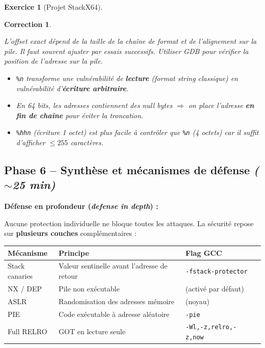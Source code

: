 \documentclass[a4paper,11pt]{article}
\theoremstyle{plain}
\newtheorem{correction}{Correction}
\theoremstyle{definition}
\newtheorem{exercice}{Exercice}
\begin{document}
\begin{exercice}[Projet StackX64]
\begin{correction}
\begin{attention}
L'offset exact dépend de la taille de la chaîne de format et de l'alignement sur la pile. Il faut souvent ajuster par essais successifs. Utiliser GDB pour vérifier la position de l'adresse sur la pile.
\end{attention}

\begin{pointcle}
\begin{itemize}
    \item \texttt{\%n} transforme une vulnérabilité de \textbf{lecture} (format string classique) en vulnérabilité d'\textbf{écriture arbitraire}.
    \item En 64 bits, les adresses contiennent des null bytes $\Rightarrow$ on place l'adresse \textbf{en fin de chaîne} pour éviter la troncation.
    \item \texttt{\%hhn} (écriture 1 octet) est plus facile à contrôler que \texttt{\%n} (4 octets) car il suffit d'afficher $\leq 255$ caractères.
\end{itemize}
\end{pointcle}

\end{correction}



\subsection*{Phase 6 -- Synthèse et mécanismes de défense \hfill\normalfont\textit{($\sim$25 min)}}

\begin{rappel}
\textbf{Défense en profondeur (\textit{defense in depth}) :}

Aucune protection individuelle ne bloque toutes les attaques. La sécurité repose sur \textbf{plusieurs couches} complémentaires :

\begin{center}
\begin{tabular}{llll}
\toprule
\textbf{Mécanisme} & \textbf{Principe} & \textbf{Flag GCC} \\
\midrule
Stack canaries & Valeur sentinelle avant l'adresse de retour & \texttt{-fstack-protector} \\
NX / DEP & Pile non exécutable & (activé par défaut) \\
ASLR & Randomisation des adresses mémoire & (noyau) \\
PIE & Code exécutable à adresse aléatoire & \texttt{-pie} \\
Full RELRO & GOT en lecture seule & \texttt{-Wl,-z,relro,-z,now} \\
\bottomrule
\end{tabular}
\end{center}
\end{rappel}


\end{exercice}
\end{document}
